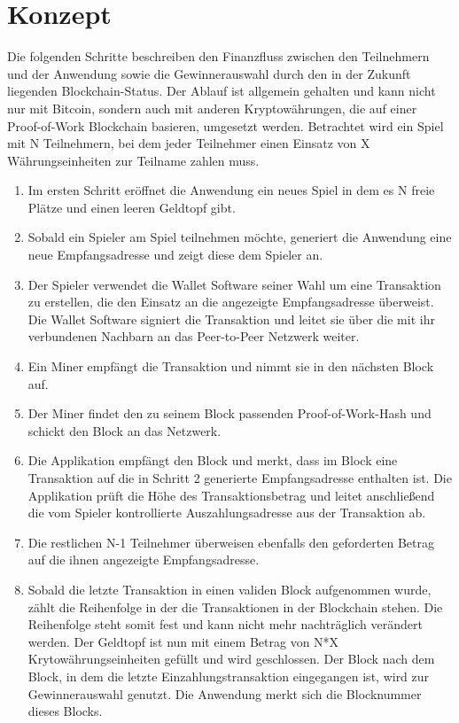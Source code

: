 \section{Konzept}

Die folgenden Schritte beschreiben den Finanzfluss zwischen den Teilnehmern und der Anwendung sowie die Gewinnerauswahl durch den in der Zukunft liegenden Blockchain-Status. Der Ablauf ist allgemein gehalten und kann nicht nur mit Bitcoin, sondern auch mit anderen Kryptowährungen, die auf einer Proof-of-Work Blockchain basieren, umgesetzt werden. Betrachtet wird ein Spiel mit N Teilnehmern, bei dem jeder Teilnehmer einen Einsatz von X Währungseinheiten zur Teilname zahlen muss. 

\begin{enumerate}
\item Im ersten Schritt eröffnet die Anwendung ein neues Spiel in dem es N freie Plätze und einen leeren Geldtopf gibt.
\item Sobald ein Spieler am Spiel teilnehmen möchte, generiert die Anwendung eine neue Empfangsadresse und zeigt diese dem Spieler an. 
\item Der Spieler verwendet die Wallet Software seiner Wahl um eine Transaktion zu erstellen, die den Einsatz an die angezeigte Empfangsadresse überweist. Die Wallet Software signiert die Transaktion und leitet sie über die mit ihr verbundenen Nachbarn an das Peer-to-Peer Netzwerk weiter.
\item Ein Miner empfängt die Transaktion und nimmt sie in den nächsten Block auf.
\item Der Miner findet den zu seinem Block passenden Proof-of-Work-Hash und schickt den Block an das Netzwerk.
\item Die Applikation empfängt den Block und merkt, dass im Block eine Transaktion auf die in Schritt 2 generierte Empfangsadresse enthalten ist. Die Applikation prüft die Höhe des Transaktionsbetrag und leitet anschließend die vom Spieler kontrollierte Auszahlungsadresse aus der Transaktion ab. 
\item  Die restlichen N-1 Teilnehmer überweisen ebenfalls den geforderten Betrag auf die ihnen angezeigte Empfangsadresse.
\item  Sobald die letzte Transaktion in einen validen Block aufgenommen wurde, zählt die Reihenfolge in der die Transaktionen in der Blockchain stehen. Die Reihenfolge steht somit fest und kann nicht mehr nachträglich verändert werden. Der Geldtopf ist nun mit einem Betrag von N*X Krytowährungseinheiten gefüllt und wird geschlossen. Der Block nach dem Block, in dem die letzte Einzahlungstransaktion eingegangen ist, wird zur Gewinnerauswahl genutzt. Die Anwendung merkt sich die Blocknummer dieses Blocks.

\end{enumerate}
